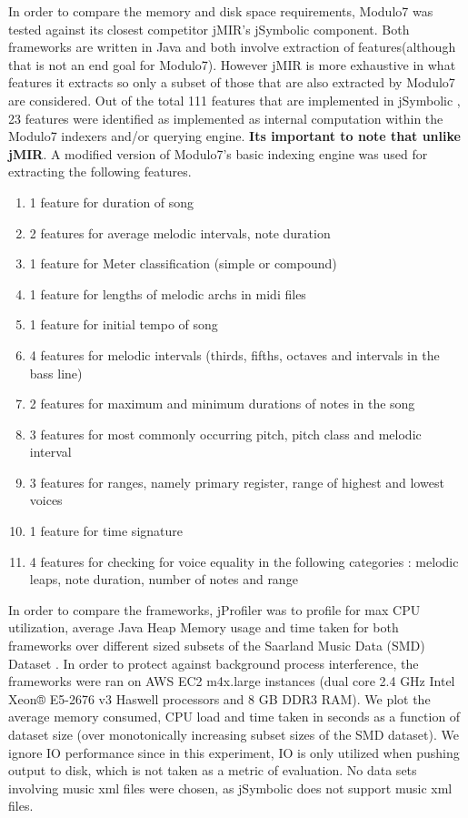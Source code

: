 \noindent In order to compare the memory and disk space requirements, Modulo7 was tested against its closest competitor jMIR's \cite{jMIR} jSymbolic component. Both frameworks are written in Java and both involve extraction of features(although that is not an end goal for Modulo7). However jMIR is more exhaustive in what features it extracts so only a subset of those that are also extracted by Modulo7 are considered. Out of the total 111 features that are implemented in jSymbolic \cite{jSymbolic}, 23 features were identified as implemented as internal computation within the Modulo7 indexers and/or querying engine. \textbf{Its important to note that unlike jMIR}. A modified version of Modulo7's basic indexing engine was used for extracting the following features. 
\begin{enumerate}
\item 1 feature for duration of song
\item 2 features for average melodic intervals, note duration
\item 1 feature for Meter classification (simple or compound)
\item 1 feature for lengths of melodic archs in midi files
\item 1 feature for initial tempo of song
\item 4 features for melodic intervals (thirds, fifths, octaves and intervals in the bass line)
\item 2 features for maximum and minimum durations of notes in the song
\item 3 features for most commonly occurring pitch, pitch class and melodic interval
\item 3 features for ranges, namely primary register, range of highest and lowest voices
\item 1 feature for time signature
\item 4 features for checking for voice equality in the following categories : melodic leaps, note duration, number of notes and range \\
\end{enumerate}
\noindent In order to compare the frameworks, jProfiler was to profile for max CPU utilization, average Java Heap Memory usage and time taken for both frameworks over different sized subsets of the Saarland Music Data (SMD) Dataset \cite{saarlandmsd}. In order to protect against background process interference, the frameworks were ran on AWS EC2 m4x.large instances (dual core 2.4 GHz Intel Xeon® E5-2676 v3 Haswell processors and 8 GB DDR3 RAM). We plot the average memory consumed, CPU load and time taken in seconds as a function of dataset size (over monotonically increasing subset sizes of the SMD dataset). We ignore IO performance since in this experiment, IO is only utilized when pushing output to disk, which is not taken as a metric of evaluation. No data sets involving music xml files were chosen, as jSymbolic does not support music xml files. 

